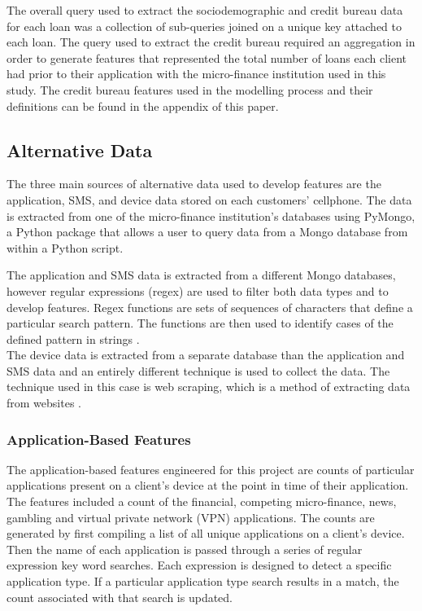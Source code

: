 The overall query used to extract the sociodemographic and credit bureau data for each loan was a collection of sub-queries joined on a unique key attached to each loan. The query used to extract the credit bureau required an aggregation in order to generate features that represented the total number of loans each client had prior to their application with the micro-finance institution used in this study. The credit bureau features used in the modelling process and their definitions can be found in the appendix of this paper.

\subsection{Alternative Data}

The three main sources of alternative data used to develop features are the application, SMS, and device data stored on each customers' cellphone. The data is extracted from one of the micro-finance institution's  databases using PyMongo, a Python package that allows a user to query data from a Mongo database from within a Python script. \newpage

The application and SMS data is extracted from a different Mongo databases, however regular expressions (regex) are used to filter both data types and to develop features. Regex functions are sets of sequences of characters that define a particular search pattern. The functions are then used to identify cases of the defined pattern in strings \parencite{Regex}. \\

The device data is extracted from a separate database than the application and SMS data and an entirely different technique is used to collect the data. The technique used in this case is web scraping, which is a method of extracting data from websites \parencite{WebScraping}. 

\subsubsection{Application-Based Features}

The application-based features engineered for this project are counts of particular applications present on a client's device at the point in time of their application. The features included a count of the financial, competing micro-finance, news, gambling and virtual private network (VPN) applications. The counts are generated by first compiling a list of all unique applications on a client's device. Then the name of each application is passed through a series of regular expression key word searches. Each expression is designed to detect a specific application type. If a particular application type search results in a match, the count associated with that search is updated. \\

